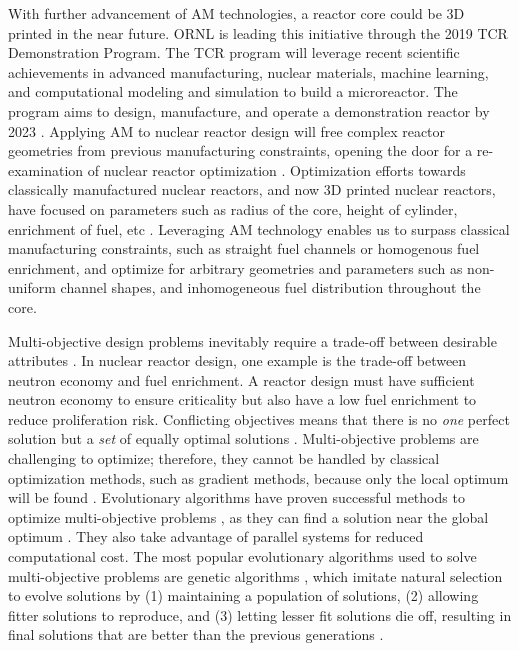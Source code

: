 With further advancement of \gls{AM} technologies, a reactor 
core could be 3D printed in the near future. 
\gls{ORNL} is leading this initiative through the 2019 \gls{TCR} Demonstration 
Program. 
The \gls{TCR} program will leverage recent scientific achievements in advanced 
manufacturing, nuclear materials, machine learning, and computational modeling 
and simulation to build a microreactor. 
The program aims to design, manufacture, and operate a demonstration reactor 
by 2023 \cite{terrani_transformational_2019}. 
Applying \gls{AM} to nuclear reactor design will free complex 
reactor geometries from previous manufacturing constraints,
opening the door for a re-examination of nuclear reactor optimization 
\cite{sobes_artificial_2020}. 
Optimization efforts towards classically manufactured nuclear reactors, and now
3D printed nuclear reactors, have focused on parameters such as radius of the 
core, height of cylinder, enrichment of fuel, etc 
\cite{sobes_artificial_2020,sacco_two_2006,kumar_new_2015,pereira_parallel_2008}. 
Leveraging \gls{AM} technology enables us to surpass classical 
manufacturing constraints, such as straight fuel channels or homogenous fuel 
enrichment, and optimize for arbitrary geometries and parameters 
such as non-uniform channel shapes, and inhomogeneous fuel distribution throughout 
the core. 

Multi-objective design problems inevitably require a trade-off between 
desirable attributes \cite{byrne_evolving_2014,simon_sciences_2019}. 
In nuclear reactor design, one example is the trade-off between neutron economy 
and fuel enrichment.
A reactor design must have sufficient neutron economy to ensure criticality but 
also have a low fuel enrichment to reduce proliferation risk. 
Conflicting objectives means that there is no \textit{one} perfect solution but 
a \textit{set} of equally optimal solutions \cite{byrne_evolving_2014}.
Multi-objective problems are challenging to optimize; therefore, they cannot be 
handled by classical optimization methods, such as gradient methods, because only 
the local optimum will be found \cite{renner_genetic_2003}. 
Evolutionary algorithms have proven successful methods to optimize 
multi-objective problems \cite{krish_practical_2011}, as 
they can find a solution near the global optimum \cite{renner_genetic_2003}.
They also take advantage of parallel systems for reduced computational cost.
The most popular evolutionary algorithms used to solve multi-objective 
problems are genetic algorithms \cite{byrne_evolving_2014, krish_practical_2011},
which imitate natural selection to evolve solutions by (1) maintaining a 
population of solutions, (2) allowing fitter solutions to reproduce, and (3) 
letting lesser fit solutions die off, resulting in final solutions that are 
better than the previous generations \cite{renner_genetic_2003}. 

